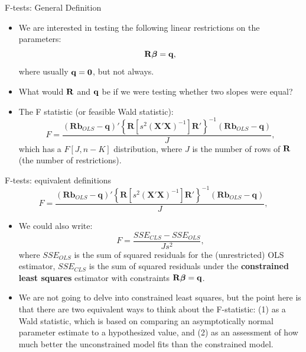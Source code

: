 \begin{frame}{F-tests: General Definition}
\begin{itemize}
	\item We are interested in testing the following linear restrictions on the parameters:\[
	{\bf R} \boldsymbol{\beta} = {\bf q}, 
	\]
	where usually $ {\bf q} = {\bf 0}$, but not always.

	\item What would ${\bf R}$ and ${\bf q}$ be if we were testing whether two slopes were equal?

	\item The F statistic (or feasible Wald statistic):\[
F=\frac{\left(\boldsymbol{R}\boldsymbol{b}_{OLS}-\boldsymbol{q}\right)'\left\{ \boldsymbol{R}\left[s^{2}\left(\boldsymbol{X}'\boldsymbol{X}\right)^{-1}\right]\boldsymbol{R}'\right\} ^{-1}\left(\boldsymbol{R}\boldsymbol{b}_{OLS}-\boldsymbol{q}\right)}{J},
\]
which has a $F\left[J,n-K\right]$ distribution, where $J$ is the number of rows of ${\bf R}$ (the number of restrictions).

\end{itemize}
\end{frame}

\begin{frame}{F-tests: equivalent definitions}
\[
F=\frac{\left(\boldsymbol{R}\boldsymbol{b}_{OLS}-\boldsymbol{q}\right)'\left\{ \boldsymbol{R}\left[s^{2}\left(\boldsymbol{X}'\boldsymbol{X}\right)^{-1}\right]\boldsymbol{R}'\right\} ^{-1}\left(\boldsymbol{R}\boldsymbol{b}_{OLS}-\boldsymbol{q}\right)}{J},
\]
\begin{itemize}
	\item We could also write:\[
		F = \frac{SSE_{CLS} - SSE_{OLS}}{Js^2},
	\]
	where $SSE_{OLS}$ is the sum of squared residuals for the (unrestricted) OLS estimator, $SSE_{CLS}$
	is the sum of squared residuals under the {\bf constrained least squares} estimator with constraints ${\bf R} \boldsymbol{\beta} = {\bf q}$.

	\item We are not going to delve into constrained least squares, but the point here is that there are two equivalent ways to think about
	the F-statistic: (1) as a Wald statistic, which is based on comparing an asymptotically normal parameter estimate to a hypothesized value, 
	and (2) as an assessment of how much better the unconstrained model fits than the constrained model. 
\end{itemize}
\end{frame}





